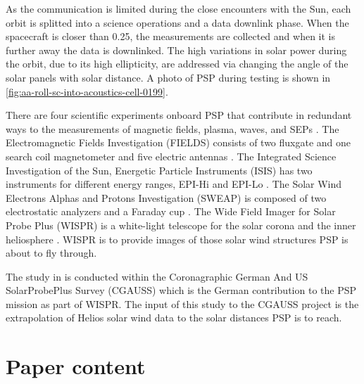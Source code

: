 As the communication is limited during the close encounters with the Sun, each orbit is splitted into a science operations and a data downlink phase. When the spacecraft is closer than \SI{0.25}{\au}, the measurements are collected and when it is further away the data is downlinked. The high variations in solar power during the orbit, due to its high ellipticity, are addressed via changing the angle of the solar panels with solar distance. A photo of PSP during testing is shown in \autoref{fig:aa-roll-sc-into-acoustics-cell-0199}.

There are four scientific experiments onboard PSP that contribute in redundant ways to the measurements of magnetic fields, plasma, waves, and SEPs \citep{Fox2015}.
The Electromagnetic Fields Investigation (FIELDS) consists of two fluxgate and one search coil magnetometer and five electric antennas \citep{Bale2016}. %
The Integrated Science Investigation of the Sun, Energetic Particle Instruments (IS\sun{}IS) has two instruments for different energy ranges, EPI-Hi and EPI-Lo \citep{McComas2016}. %
The Solar Wind Electrons Alphas and Protons Investigation (SWEAP) is composed of two electrostatic analyzers and a Faraday cup \citep{Kasper2016}. %
The Wide Field Imager for Solar Probe Plus (WISPR) is a white-light telescope for the solar corona and the inner heliosphere \citep{Vourlidas2016}. WISPR is to provide images of those solar wind structures PSP is about to fly through. %

The study in \citet{Venzmer2018} is conducted within the Coronagraphic German And US SolarProbePlus Survey (CGAUSS) which is the German contribution to the PSP mission as part of WISPR. The input of this study to the CGAUSS project is the extrapolation of Helios solar wind data to the solar distances PSP is to reach.


\section{Paper content}

